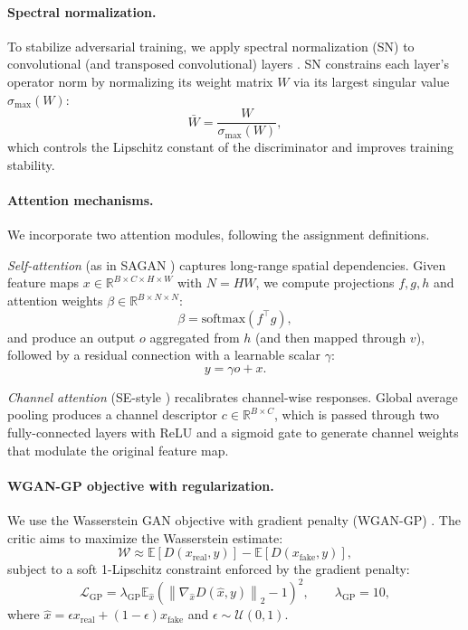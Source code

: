 \paragraph{Spectral normalization.}
To stabilize adversarial training, we apply spectral normalization (SN) to convolutional (and transposed convolutional) layers \citep{miyato2018sn}. SN constrains each layer's operator norm by normalizing its weight matrix $W$ via its largest singular value $\sigma_{\max}(W)$:
\[
\bar{W} = \frac{W}{\sigma_{\max}(W)},
\]
which controls the Lipschitz constant of the discriminator and improves training stability.

\paragraph{Attention mechanisms.}
We incorporate two attention modules, following the assignment definitions.

\emph{Self-attention} (as in SAGAN \citep{zhang2019sagan}) captures long-range spatial dependencies. Given feature maps $x\in\mathbb{R}^{B\times C\times H\times W}$ with $N=HW$, we compute projections $f,g,h$ and attention weights $\beta\in\mathbb{R}^{B\times N\times N}$:
\[
\beta = \mathrm{softmax}(f^\top g),
\]
and produce an output $o$ aggregated from $h$ (and then mapped through $v$), followed by a residual connection with a learnable scalar $\gamma$:
\[
y = \gamma o + x.
\]

\emph{Channel attention} (SE-style \citep{hu2018senet}) recalibrates channel-wise responses. Global average pooling produces a channel descriptor $c\in\mathbb{R}^{B\times C}$, which is passed through two fully-connected layers with ReLU and a sigmoid gate to generate channel weights that modulate the original feature map.

\paragraph{WGAN-GP objective with regularization.}
We use the Wasserstein GAN objective with gradient penalty (WGAN-GP) \citep{gulrajani2017improved}. The critic aims to maximize the Wasserstein estimate:
\[
\mathcal{W} \approx \mathbb{E}[D(x_{\mathrm{real}},y)] - \mathbb{E}[D(x_{\mathrm{fake}},y)],
\]
subject to a soft 1-Lipschitz constraint enforced by the gradient penalty:
\[
\mathcal{L}_{\mathrm{GP}}=
\lambda_{\mathrm{GP}}
\mathbb{E}_{\hat{x}}\left(\left\|\nabla_{\hat{x}} D(\hat{x},y)\right\|_2 - 1\right)^2,
\qquad \lambda_{\mathrm{GP}}=10,
\]
where $\hat{x}=\epsilon x_{\mathrm{real}}+(1-\epsilon)x_{\mathrm{fake}}$ and $\epsilon\sim\mathcal{U}(0,1)$.

